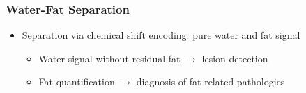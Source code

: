 \begin{frame}
\frametitle{Water-Fat Separation}
\begin{itemize}
	\item Separation via chemical shift encoding: pure water and fat signal
	\begin{itemize}
		\item Water signal without residual fat $\rightarrow$ lesion detection
		\item Fat quantification $\rightarrow$ diagnosis of fat-related pathologies
	\end{itemize}
\end{itemize}

	\begin{figure}
		\centering
	\end{figure}
	\vspace{-0.5ex}

\end{frame}

